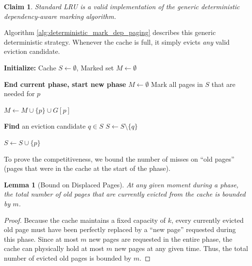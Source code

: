 \documentclass[a4paper]{article}
\newtheorem{lemma}{Lemma}      %
\newtheorem{claim}{Claim}      %
\begin{document}
\begin{claim}
Standard LRU is a valid implementation of the generic deterministic dependency-aware marking algorithm.
\end{claim}

Algorithm \ref{alg:deterministic_mark_dep_paging} describes this generic deterministic strategy. Whenever the cache is full, it simply evicts \textit{any} valid eviction candidate. 

\begin{algorithm}
\caption{Deterministic Marking Algorithm for Dependency Paging}
\label{alg:deterministic_mark_dep_paging}
\begin{algorithmic}[1]
\State \textbf{Initialize:} Cache $S \gets \emptyset$, Marked set $M \gets \emptyset$

    
     
        \State \textbf{End current phase, start new phase}
        \State $M \gets \emptyset$ 
        \State Mark all pages in $S$ that are needed for $p$
    \EndIf
    
    \State $M \gets M \cup \{p\} \cup G[p]$ 
    
     
        \State \textbf{Find} an eviction candidate $q \in S$ 
        \State $S \gets S \setminus \{q\}$ 
    \EndIf
    
        \State $S \gets S \cup \{p\}$ 
    \EndIf
\EndFor
\end{algorithmic}
\end{algorithm}

To prove the competitiveness, we bound the number of misses on ``old pages'' (pages that were in the cache at the start of the phase). 

\begin{lemma}[Bound on Displaced Pages]
\label{lemma:displaced_bound}
At any given moment during a phase, the total number of old pages that are currently evicted from the cache is bounded by $m$.
\end{lemma}
\begin{proof}
Because the cache maintains a fixed capacity of $k$, every currently evicted old page must have been perfectly replaced by a ``new page'' requested during this phase. Since at most $m$ new pages are requested in the entire phase, the cache can physically hold at most $m$ new pages at any given time. Thus, the total number of evicted old pages is bounded by $m$.
\end{proof}
\end{document}
